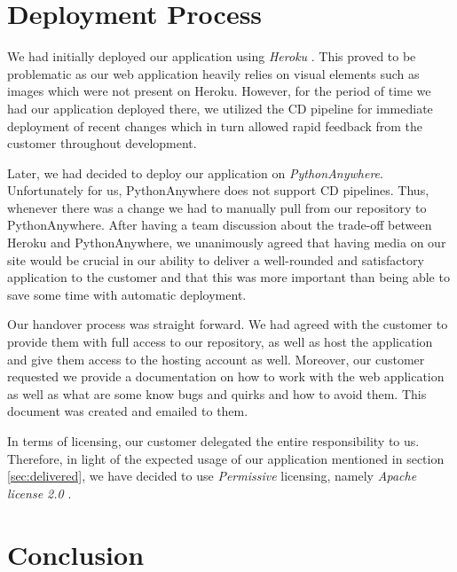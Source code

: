 \documentclass{l3proj}
\begin{document}


\section{Deployment Process}
\label{sec:deployment}
    We had initially deployed our application using \textit{Heroku} \cite{heroku}. This proved to be problematic as our web application heavily relies on visual elements such as images which were not present on Heroku. However, for the period of time we had our application deployed there, we utilized the CD pipeline for immediate deployment of recent changes which in turn allowed rapid feedback from the customer throughout development.

    Later, we had decided to deploy our application on \textit{PythonAnywhere}\cite{pythonanywhere}. Unfortunately for us, PythonAnywhere does not support CD pipelines. Thus, whenever there was a change we had to manually pull from our repository to PythonAnywhere. After having a team discussion about the trade-off between Heroku and PythonAnywhere, we unanimously agreed that having media on our site would be crucial in our ability to deliver a well-rounded and satisfactory application to the customer and that this was more important than being able to save some time with automatic deployment.
    
    Our handover process was straight forward. We had agreed with the customer to provide them with full access to our repository, as well as host the application and give them access to the hosting account as well. Moreover, our customer requested we provide a documentation on how to work with the web application as well as what are some know bugs and quirks and how to avoid them. This document was created and emailed to them.

    In terms of licensing, our customer delegated the entire responsibility to us. Therefore, in light of the expected usage of our application mentioned in section \ref{sec:delivered}, we have decided to use \textit{Permissive} \cite{permissive} licensing, namely \textit{Apache license 2.0} \cite{apache}.
    

\section{Conclusion}
\end{document}
